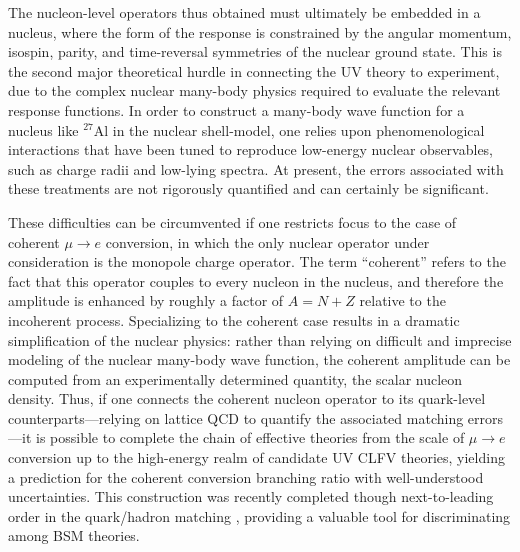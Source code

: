 \documentclass{book}[letterpaper,12pt]
\begin{document}
The nucleon-level operators thus obtained must ultimately be embedded in a nucleus, where the form of the response is constrained by the angular momentum, isospin, parity, and time-reversal symmetries of the nuclear ground state. This is the second major theoretical hurdle in connecting the UV theory to experiment, due to the complex nuclear many-body physics required to evaluate the relevant response functions. In order to construct a many-body wave function for a nucleus like $^{27}$Al in the nuclear shell-model, one relies upon phenomenological interactions that have been tuned to reproduce low-energy nuclear observables, such as charge radii and low-lying spectra. At present, the errors associated with these treatments are not rigorously quantified and can certainly be significant. 

These difficulties can be circumvented if one restricts focus to the case of coherent $\mu\rightarrow e$ conversion, in which the only nuclear operator under consideration is the monopole charge operator. The term ``coherent'' refers to the fact that this operator couples to every nucleon in the nucleus, and therefore the amplitude is enhanced by roughly a factor of $A=N+Z$ relative to the incoherent process. Specializing to the coherent case results in a dramatic simplification of the nuclear physics: rather than relying on difficult and imprecise modeling of the nuclear many-body wave function, the coherent amplitude can be computed from an experimentally determined quantity, the scalar nucleon density. Thus, if one connects the coherent nucleon operator to its quark-level counterparts---relying on lattice QCD to quantify the associated matching errors---it is possible to complete the chain of effective theories from the scale of $\mu\rightarrow e$ conversion up to the high-energy realm of candidate UV CLFV theories, yielding a prediction for the coherent conversion branching ratio with well-understood uncertainties. This construction was recently completed though next-to-leading order in the quark/hadron matching \cite{2018PhRvC..98a5208B,Cirigliano:2022ekw}, providing a valuable tool for discriminating among BSM theories.
\end{document}
